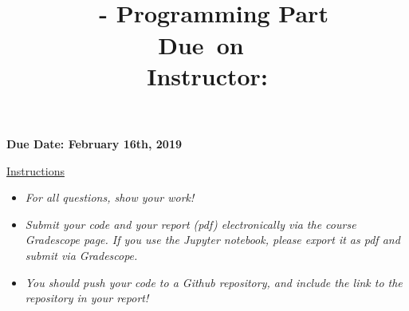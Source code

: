 \documentclass[12pt]{article}
\title{
    \vspace{0in}
    \textmd{\textbf{\hmwkClass}}\\
    \hmwkTitle \ - Programming Part\\
    \normalsize\vspace{0.1in}\small{Due\ on\ \hmwkDueDate}\\
    \vspace{0.1in}\large{Instructor: \textit{\hmwkClassInstructor\\}} 
    \vspace{0in}
}
\begin{document}
\fancyhead{}
\fancyfoot{}


{\bf Due Date: February 16th, 2019}

\vspace{-0.5cm}
\underline{Instructions}
\renewcommand{\labelitemi}{\textbullet}
\begin{itemize}
\item \emph{For all questions, show your work!}
\item \emph{Submit your code and your report (pdf) electronically via the course Gradescope page. If you use the Jupyter notebook, please export it as pdf and submit via Gradescope.}
\item \emph{You should push your code to a Github repository, and include the link to the repository in your report!}
\end{itemize}
\end{document}
